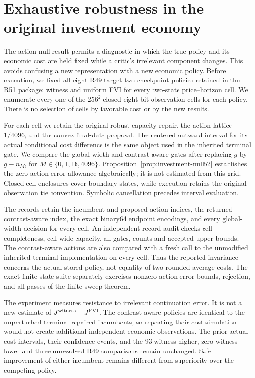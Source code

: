 \section{Exhaustive robustness in the original investment economy}\label{sec:study52}
The action-null result permits a diagnostic in which the true policy and its economic cost are held fixed while a critic's irrelevant component changes. This avoids confusing a new representation with a new economic policy. Before execution, we fixed all eight R49 target-two checkpoint policies retained in the R51 package: witness and uniform FVI for every two-state price--horizon cell. We enumerate every one of the $256^2$ closed eight-bit observation cells for each policy. There is no selection of cells by favorable cost or by the new results.

For each cell we retain the original robust capacity repair, the action lattice $1/4096$, and the convex final-date proposal. The centered outward interval for its actual conditional cost difference is the same object used in the inherited terminal gate. We compare the global-width and contrast-aware gates after replacing $g$ by $g-n_M$, for $M\in\{0,1,16,4096\}$. Proposition~\ref{prop:investment-null52} establishes the zero action-error allowance algebraically; it is not estimated from this grid. Closed-cell enclosures cover boundary states, while execution retains the original observation tie convention. Symbolic cancellation precedes interval evaluation.



The records retain the incumbent and proposed action indices, the returned contrast-aware index, the exact binary64 endpoint encodings, and every global-width decision for every cell. An independent record audit checks cell completeness, cell-wide capacity, all gates, counts and accepted upper bounds. The contrast-aware actions are also compared with a fresh call to the unmodified inherited terminal implementation on every cell. Thus the reported invariance concerns the actual stored policy, not equality of two rounded average costs. The exact finite-state suite separately exercises nonzero action-error bounds, rejection, and all passes of the finite-sweep theorem.

The experiment measures resistance to irrelevant continuation error. It is not a new estimate of $J^{\rm witness}-J^{\rm FVI}$. The contrast-aware policies are identical to the unperturbed terminal-repaired incumbents, so repeating their cost simulation would not create additional independent economic observations. The prior actual-cost intervals, their confidence events, and the 93 witness-higher, zero witness-lower and three unresolved R49 comparisons remain unchanged. Safe improvement of either incumbent remains different from superiority over the competing policy.

